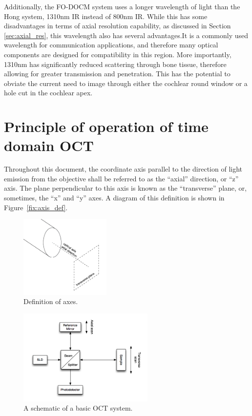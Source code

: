 Additionally, the FO-DOCM system uses a longer wavelength of light than the Hong system, 1310nm IR instead of 800nm IR. While this has some disadvantages in terms of axial resolution capability, as discussed in Section \ref{sec:axial_res}, this wavelength also has several advantages.It is a commonly used wavelength for communication applications, and therefore many optical components are designed for compatibility in this region. More importantly, 1310nm has significantly reduced scattering through bone tissue, therefore allowing for greater transmission and penetration. This has the potential to obviate the current need to image through either the cochlear round window or a hole cut in the cochlear apex. \cite{Sandell2011} \cite{Bashkatov2006}

\section{Principle of operation of time domain OCT}
\label{sec:principles_oct}

Throughout this document, the coordinate axis parallel to the direction of light emission from the objective shall be referred to as the ``axial'' direction, or ``z'' axis. The plane perpendicular to this axis is known as the ``transverse'' plane, or, sometimes, the ``x'' and ``y'' axes. A diagram of this definition is shown in Figure~\ref{fix:axis_def}.

\begin{figure}[h!]
\centering
\includegraphics[width=0.4\textwidth]{Images/Background/axes.png}
\caption{Definition of axes.\label{fig:axis_def}}
\end{figure}

\begin{figure}[h!]
  \centering
    \includegraphics[width=0.6\textwidth]{Images/Background/basic_oct.png}
      \caption{A schematic of a basic OCT system.\label{fig:basic_oct}}
\end{figure}


